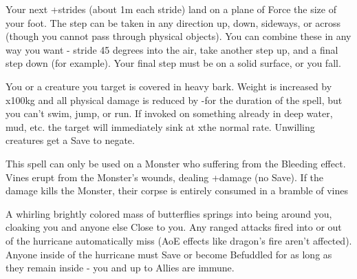 \MYSTERY [
  Name = Vaulting Step,
  Link = arcana-mystery-vaulting-step,
  Paradigm = Force,
  Save = N,
  Duration = Instant,
  Target = Self
]

Your next \DICE+\DICE strides (about 1m each stride) land on a plane of Force the size of your foot.  The step can be taken in any direction up, down, sideways, or across (though you cannot pass through physical objects).  You can combine these in any way you want - stride 45 degrees into the air, take another step up, and a final step down (for example).  Your final step must be on a solid surface, or you fall. 


\MYSTERY [
  Name = Barkskin,
  Link = arcana-mystery-barkskin,
  Paradigm = Biomancy,
  Save = Y (neg.),
  Duration = Combat or \SUM Minutes,
  Target = Self or Close Target(s)
]

You or a creature you target is covered in heavy bark.  Weight is increased by \DICE x100kg and all physical damage is reduced by -\DICE for the duration of the spell, but you can't swim, jump, or run. If invoked on something already in deep water, mud, etc. the target will immediately sink at x\DICE the normal rate. Unwilling creatures get a Save to negate. 

\MYSTERY [
  Name = Bloodvine,
  Link = arcana-mystery-bloodvine,
  Paradigm = Biomancy,
  Save = N,
  Duration = Instant,
  Target = Close or Nearby Target(s)
]

This spell can only be used on a Monster who suffering from the Bleeding effect.  Vines erupt from the Monster's wounds, dealing \SUMDICE+\DICE damage (no Save).  If the damage kills the Monster, their corpse is entirely consumed in a bramble of vines

\MYSTERY [
  Name = Butterfly Hurricane,
  Link = arcana-mystery-butterfly-hurricane,
  Paradigm = Biomancy,
  Save = Y (neg.),
  Duration = Combat or \SUM Minutes,
  Target = Self
]

A whirling brightly colored mass of butterflies springs into being around you, cloaking you and anyone else Close to you.  Any ranged attacks fired into or out of the hurricane automatically miss (AoE effects like dragon's fire aren't affected).  Anyone inside of the hurricane must Save or become Befuddled for as long as they remain inside - you and up to \DICE Allies are immune.

\MYSTERY [
  Name = Clearwater,
  Link = arcana-mystery-clearwater,
  Paradigm = Elements,
  Save = n/a,
  Duration = Instant,
  Target = Self or Close Target(s)
]

